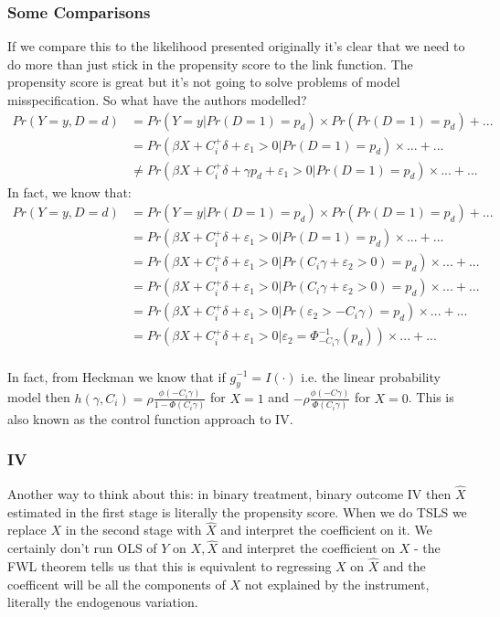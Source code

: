 \documentclass{article}
\begin{document}
\subsubsection*{Some Comparisons}
If we compare this to the likelihood presented originally it's clear that we need 
to do more than just stick in the propensity score to the link function. The 
propensity score is great but it's not going to solve 
problems of model misspecification. So what have the authors modelled?
\begin{align*}
    Pr(Y = y, D = d) &=  Pr(Y = y | Pr(D = 1) = p_d) \times Pr(Pr(D = 1) = p_d) + ...\\
    &= Pr(\beta X + C_i^+\delta + \varepsilon_1 > 0 | Pr(D = 1) = p_d) \times ...  + ...\\
    &\neq Pr(\beta X + C_i^+ \delta + \gamma p_d + \varepsilon_1 > 0 | Pr(D =  1) = p_d) \times ... + ...
\end{align*}
In fact, we know that:
\begin{align*}
    Pr(Y = y, D = d) &=  Pr(Y = y | Pr(D = 1) = p_d) \times Pr(Pr(D = 1) = p_d) + ...\\
    &= Pr(\beta X + C_i^+\delta + \varepsilon_1 > 0 | Pr(D = 1) = p_d) \times ... + ... \\
    &= Pr(\beta X + C_i^+\delta + \varepsilon_1 > 0 | Pr(C_i \gamma + \varepsilon_2 > 0) = p_d) \times ...  + ...\\
    &= Pr(\beta X + C_i^+\delta + \varepsilon_1 > 0 | Pr(C_i \gamma + \varepsilon_2 > 0) = p_d) \times ...  + ...\\
    &= Pr(\beta X + C_i^+\delta + \varepsilon_1 > 0 | Pr(\varepsilon_2 > -C_i \gamma) = p_d) \times ...  + ...\\
    &= Pr(\beta X + C_i^+\delta + \varepsilon_1 > 0 | \varepsilon_2  = \Phi^{-1}_{-C_i\gamma}\left(p_d\right)) \times ...  + ...\\
\end{align*}




In fact, 
from Heckman we know that if $g_y^{-1} = I(\cdot)$ i.e. the linear probability model
then $h(\gamma, C_i) = \rho \frac{\phi(-C_i\gamma)}{1 - \Phi(C_i \gamma)}$ for $X = 1$ 
and $-\rho \frac{\phi(-C\gamma)}{\Phi(C_i \gamma)}$ for $X = 0$. This is also known 
as the control function approach to IV.

\subsubsection*{IV}
Another way to think about this: in binary treatment, binary outcome IV then $\hat{X}$ 
estimated in the first stage is literally the  propensity score. When we do TSLS 
we replace $X$ in the second stage with $\hat{X}$ and interpret the coefficient on it. 
We certainly don't run OLS of $Y$ on $X, \hat{X}$ and interpret the coefficient on 
$X$ - the FWL theorem tells us that this is equivalent to regressing $X$ on $\hat{X}$ and 
 the coefficent will be all the components of $X$ not explained by the instrument, 
 literally the endogenous variation.
\end{document}
